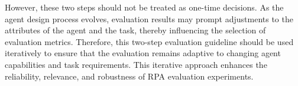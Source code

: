 However, these two steps should not be treated as one-time decisions. As the agent design process evolves, evaluation results may prompt adjustments to the attributes of the agent and the task, thereby influencing the selection of evaluation metrics. Therefore, this two-step evaluation guideline should be used iteratively to ensure that the evaluation remains adaptive to changing agent capabilities and task requirements. This iterative approach enhances the reliability, relevance, and robustness of RPA evaluation experiments.







